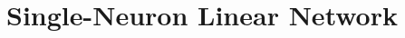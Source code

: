 \documentclass{article}
\theoremstyle{plain}
\theoremstyle{definition}
\theoremstyle{remark}
\begin{document}







\clearpage
\section{Single-Neuron Linear Network}
\label{app:single-neuron}
\end{document}
